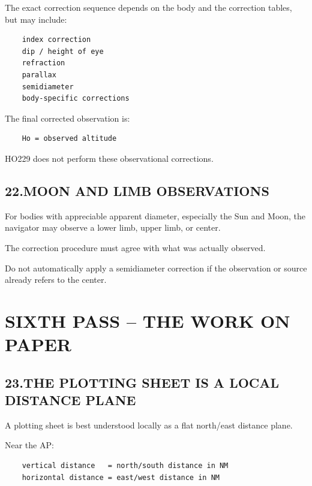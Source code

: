 \documentclass[11pt]{article}
\begin{document}
The exact correction sequence depends on the body and the correction tables, but may include:

\begin{verbatim}
    index correction
    dip / height of eye
    refraction
    parallax
    semidiameter
    body-specific corrections
\end{verbatim}

The final corrected observation is:

\begin{verbatim}
    Ho = observed altitude
\end{verbatim}

HO229 does not perform these observational corrections.

\subsection*{22.\quad MOON AND LIMB OBSERVATIONS}

For bodies with appreciable apparent diameter, especially the Sun and Moon, the navigator may observe a lower limb, upper limb, or center.

The correction procedure must agree with what was actually observed.

Do not automatically apply a semidiameter correction if the observation or source already refers to the center.

\section*{SIXTH PASS -- THE WORK ON PAPER}

\subsection*{23.\quad THE PLOTTING SHEET IS A LOCAL DISTANCE PLANE}

A plotting sheet is best understood locally as a flat north/east distance plane.

Near the AP:

\begin{verbatim}
    vertical distance   = north/south distance in NM
    horizontal distance = east/west distance in NM
\end{verbatim}
\end{document}
